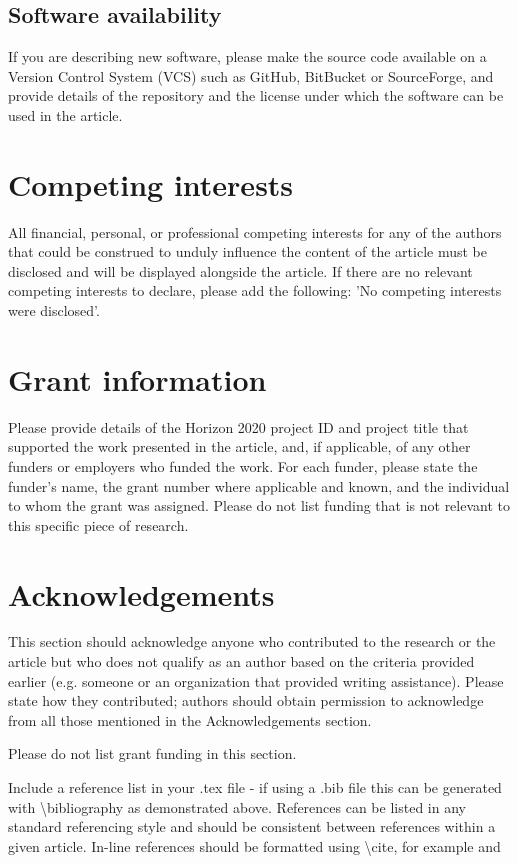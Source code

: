 \documentclass[10pt,a4paper]{article}
\begin{document}
\subsection*{Software availability}
If you are describing new software, please make the source code available on a Version Control System (VCS) such as GitHub, BitBucket or SourceForge, and provide details of the repository and the license under which the software can be used in the article.

\section*{Competing interests}
All financial, personal, or professional competing interests for any of the authors that could be construed to unduly influence the content of the article must be disclosed and will be displayed alongside the article. If there are no relevant competing interests to declare, please add the following: 'No competing interests were disclosed'.

\section*{Grant information}
Please provide details of the Horizon 2020 project ID and project title that supported the work presented in the article, and, if applicable, of any other funders or employers who funded the work. For each funder, please state the funder’s name, the grant number where applicable and known, and the individual to whom the grant was assigned.
Please do not list funding that is not relevant to this specific piece of research.

\section*{Acknowledgements}
This section should acknowledge anyone who contributed to the research or the article but who does not qualify as an author based on the criteria provided earlier (e.g. someone or an organization that provided writing assistance). Please state how they contributed; authors should obtain permission to acknowledge from all those mentioned in the Acknowledgements section.

Please do not list grant funding in this section.

{\small
}

Include a reference list in your .tex file - if using a .bib file this can be generated with \textbackslash bibliography as demonstrated above. References can be listed in any standard referencing style and should be consistent between references within a given article. In-line references should be formatted using \textbackslash cite, for example \cite{Smith:2012qr} and \cite{Smith:2013jd} 
\end{document}
